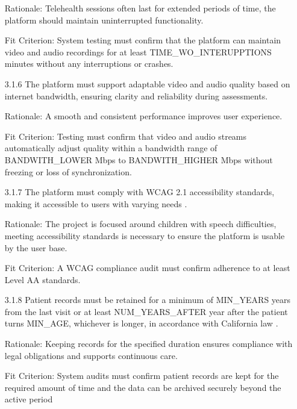 \documentclass[12pt]{article}
\begin{document}
\begin{itemize}
  \item[] Rationale: Telehealth sessions often last for extended periods of time, the platform should maintain uninterrupted functionality.
  \item[] Fit Criterion: System testing must confirm that the platform can maintain video and audio recordings for at least TIME\_WO\_INTERUPPTIONS minutes without any interruptions or crashes.
  \item[3.1.6] The platform must support adaptable video and audio quality based on internet bandwidth, ensuring clarity and reliability during assessments.
  \item[] Rationale: A smooth and consistent performance improves user experience.
  \item[] Fit Criterion: Testing must confirm that video and audio streams automatically adjust quality within a bandwidth range of BANDWITH\_LOWER Mbps to BANDWITH\_HIGHER Mbps without freezing or loss of synchronization.
  \item[3.1.7] The platform must comply with WCAG 2.1 accessibility standards, making it accessible to users with varying needs \cite{wcag}.
  \item[] Rationale: The project is focused around children with speech difficulties, meeting accessibility standards is necessary to ensure the platform is usable by the user base.
  \item[] Fit Criterion: A WCAG compliance audit must confirm adherence to at least Level AA standards.
  \item[3.1.8] Patient records must be retained for a minimum of MIN\_YEARS years from the last visit or at least NUM\_YEARS\_AFTER year after the patient turns MIN\_AGE, whichever is 
  longer, in accordance with California law \cite{californialaw}.
  \item[] Rationale: Keeping records for the specified duration ensures compliance with legal obligations and supports continuous care.
  \item[] Fit Criterion: System audits must confirm patient records are kept for the required amount of time and the data can be archived securely beyond the active period
\end{itemize}
\end{document}
